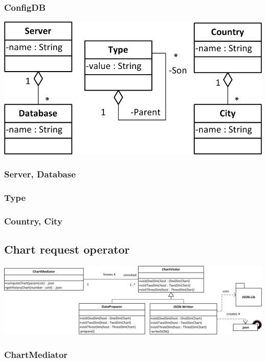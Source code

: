 \subsubsection*{ConfigDB}

\begin{center}
\includegraphics{Pictures/Parts/Strings.png}
\end{center}  
\subsubsection*{Server, Database}
\subsubsection*{Type}
\subsubsection*{Country, City}

\subsection{Chart request operator}

\begin{center}
\includegraphics[width=1\linewidth]{Pictures/Parts/MediVisi.png}
\end{center}  
\subsubsection*{ChartMediator}
